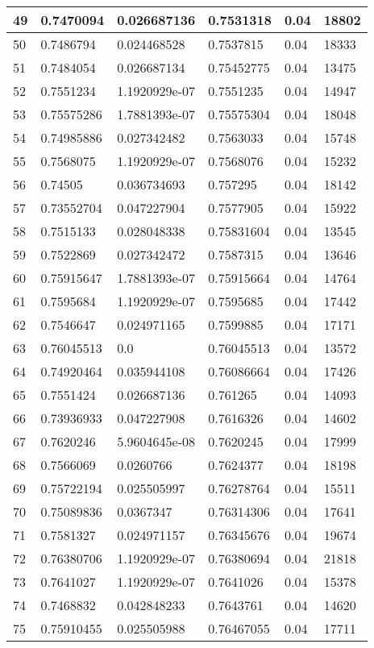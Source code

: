 \begin{longtable}{|l|l|l|l|l|l|}
49 & 0.7470094 & 0.026687136 & 0.7531318 & 0.04 & 18802 \\ \hline 
50 & 0.7486794 & 0.024468528 & 0.7537815 & 0.04 & 18333 \\ \hline 
51 & 0.7484054 & 0.026687134 & 0.75452775 & 0.04 & 13475 \\ \hline 
52 & 0.7551234 & 1.1920929e-07 & 0.7551235 & 0.04 & 14947 \\ \hline 
53 & 0.75575286 & 1.7881393e-07 & 0.75575304 & 0.04 & 18048 \\ \hline 
54 & 0.74985886 & 0.027342482 & 0.7563033 & 0.04 & 15748 \\ \hline 
55 & 0.7568075 & 1.1920929e-07 & 0.7568076 & 0.04 & 15232 \\ \hline 
56 & 0.74505 & 0.036734693 & 0.757295 & 0.04 & 18142 \\ \hline 
57 & 0.73552704 & 0.047227904 & 0.7577905 & 0.04 & 15922 \\ \hline 
58 & 0.7515133 & 0.028048338 & 0.75831604 & 0.04 & 13545 \\ \hline 
59 & 0.7522869 & 0.027342472 & 0.7587315 & 0.04 & 13646 \\ \hline 
60 & 0.75915647 & 1.7881393e-07 & 0.75915664 & 0.04 & 14764 \\ \hline 
61 & 0.7595684 & 1.1920929e-07 & 0.7595685 & 0.04 & 17442 \\ \hline 
62 & 0.7546647 & 0.024971165 & 0.7599885 & 0.04 & 17171 \\ \hline 
63 & 0.76045513 & 0.0 & 0.76045513 & 0.04 & 13572 \\ \hline 
64 & 0.74920464 & 0.035944108 & 0.76086664 & 0.04 & 17426 \\ \hline 
65 & 0.7551424 & 0.026687136 & 0.761265 & 0.04 & 14093 \\ \hline 
66 & 0.73936933 & 0.047227908 & 0.7616326 & 0.04 & 14602 \\ \hline 
67 & 0.7620246 & 5.9604645e-08 & 0.7620245 & 0.04 & 17999 \\ \hline 
68 & 0.7566069 & 0.0260766 & 0.7624377 & 0.04 & 18198 \\ \hline 
69 & 0.75722194 & 0.025505997 & 0.76278764 & 0.04 & 15511 \\ \hline 
70 & 0.75089836 & 0.0367347 & 0.76314306 & 0.04 & 17641 \\ \hline 
71 & 0.7581327 & 0.024971157 & 0.76345676 & 0.04 & 19674 \\ \hline 
72 & 0.76380706 & 1.1920929e-07 & 0.76380694 & 0.04 & 21818 \\ \hline 
73 & 0.7641027 & 1.1920929e-07 & 0.7641026 & 0.04 & 15378 \\ \hline 
74 & 0.7468832 & 0.042848233 & 0.7643761 & 0.04 & 14620 \\ \hline 
75 & 0.75910455 & 0.025505988 & 0.76467055 & 0.04 & 17711 \\ \hline 
\end{longtable}